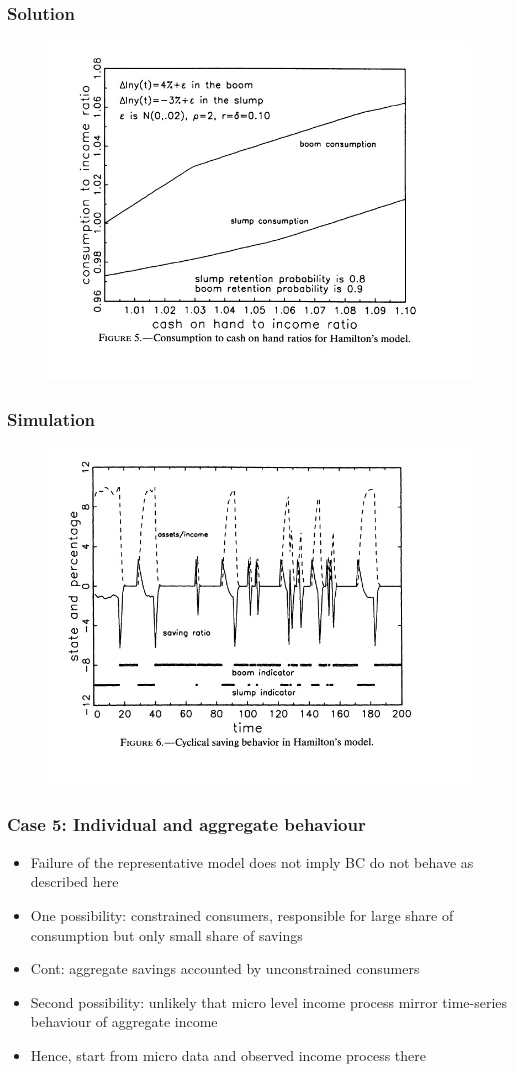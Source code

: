 \documentclass[mathserif]{beamer}
\begin{document}
\begin{frame}
\frametitle{Solution}
\begin{figure}
\includegraphics[height=2.5 in, scale=0.5]{figure5.jpg}
\end{figure}
\end{frame}

\begin{frame}
\frametitle{Simulation}
\begin{figure}
\includegraphics[height=2.5 in, scale=0.5]{figure6.jpg}
\end{figure}
\end{frame}

\begin{frame}
\frametitle{Case 5: Individual and aggregate behaviour}
\begin{itemize}
  \item Failure of the representative model does not imply BC do not behave as described here
  \item One possibility: constrained consumers, responsible for large share of consumption but only small share of savings
  \item Cont: aggregate savings accounted by unconstrained consumers
  \item Second possibility: unlikely that micro level income process mirror time-series behaviour of aggregate income
  \item Hence, start from micro data and observed income process there
\end{itemize}
\end{frame}
\end{document}
